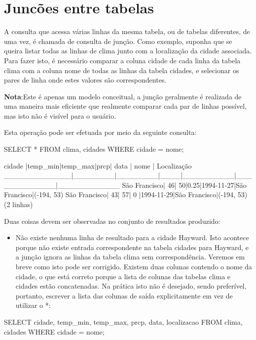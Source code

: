 \section{Juncões entre tabelas}\setcounter{SteP}{1}
 A consulta que acessa várias linhas da mesma tabela, ou de tabelas diferentes, de uma vez, é chamada de consulta de junção. Como exemplo, suponha que se queira listar todas as linhas de clima junto com a localização da cidade associada. Para fazer isto, é necessário comparar a coluna cidade de cada linha da tabela clima com a coluna nome de todas as linhas da tabela cidades, e selecionar os pares de linha onde estes valores são correspondentes.

{\bf Nota}:Este é apenas um modelo conceitual, a junção geralmente é realizada de uma maneira mais eficiente que realmente comparar cada par de linhas possível, mas isto não é visível para o usuário.

Esta operação pode ser efetuada por meio da seguinte consulta:

\begin{BoxVerbatim}
SELECT *
    FROM clima, cidades
    WHERE cidade = nome;



    cidade   |temp_min|temp_max|prcp|   data   |     nome    | Localização
_____________|________|________|____|__________|_____________|____________
São Francisco|      46|      50|0.25|1994-11-27|São Francisco|(-194, 53)
São Francisco|      43|      57|  0 |1994-11-29|São Francisco|(-194, 53)
(2 linhas)
\end{BoxVerbatim}

Duas coisas devem ser observadas no conjunto de resultados produzido:
\begin{itemize}
\item{\bf }Não existe nenhuma linha de resultado para a cidade Hayward. Isto acontece porque não existe entrada correspondente na tabela cidades para Hayward, e a junção ignora as linhas da tabela clima sem correspondência. Veremos em breve como isto pode ser corrigido.
Existem duas colunas contendo o nome da cidade, o que está correto porque a lista de colunas das tabelas clima e cidades estão concatenadas. Na prática isto não é desejado, sendo preferível, portanto, escrever a lista das colunas de saída explicitamente em vez de utilizar o *:
\end{itemize}
\begin{BoxVerbatim}
SELECT cidade, temp_min, temp_max, prcp, data, localizacao
    FROM clima, cidades
    WHERE cidade = nome;
\end{BoxVerbatim}

